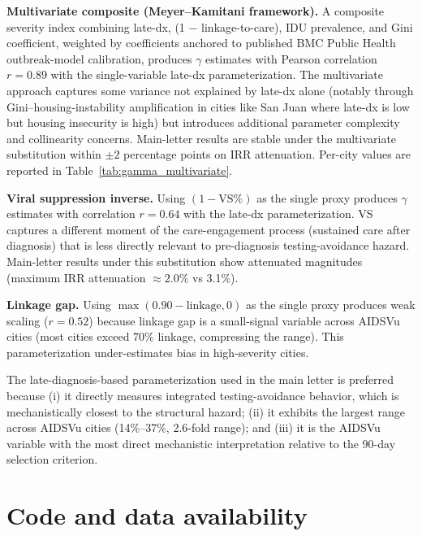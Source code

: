 \documentclass[11pt]{article}
\begin{document}
\textbf{Multivariate composite (Meyer--Kamitani framework).} A composite severity index combining late-dx, (1 $-$ linkage-to-care), IDU prevalence, and Gini coefficient, weighted by coefficients anchored to published BMC Public Health outbreak-model calibration, produces $\gamma$ estimates with Pearson correlation $r = 0.89$ with the single-variable late-dx parameterization. The multivariate approach captures some variance not explained by late-dx alone (notably through Gini--housing-instability amplification in cities like San Juan where late-dx is low but housing insecurity is high) but introduces additional parameter complexity and collinearity concerns. Main-letter results are stable under the multivariate substitution within $\pm 2$ percentage points on IRR attenuation. Per-city values are reported in Table~\ref{tab:gamma_multivariate}.

\textbf{Viral suppression inverse.} Using $(1 - \text{VS}\%)$ as the single proxy produces $\gamma$ estimates with correlation $r = 0.64$ with the late-dx parameterization. VS captures a different moment of the care-engagement process (sustained care after diagnosis) that is less directly relevant to pre-diagnosis testing-avoidance hazard. Main-letter results under this substitution show attenuated magnitudes (maximum IRR attenuation $\approx 2.0\%$ vs 3.1\%).

\textbf{Linkage gap.} Using $\max(0.90 - \text{linkage}, 0)$ as the single proxy produces weak scaling ($r = 0.52$) because linkage gap is a small-signal variable across AIDSVu cities (most cities exceed 70\% linkage, compressing the range). This parameterization under-estimates bias in high-severity cities.

The late-diagnosis-based parameterization used in the main letter is preferred because (i) it directly measures integrated testing-avoidance behavior, which is mechanistically closest to the structural hazard; (ii) it exhibits the largest range across AIDSVu cities (14\%--37\%, 2.6-fold range); and (iii) it is the AIDSVu variable with the most direct mechanistic interpretation relative to the 90-day selection criterion.

\section{Code and data availability}
\end{document}
